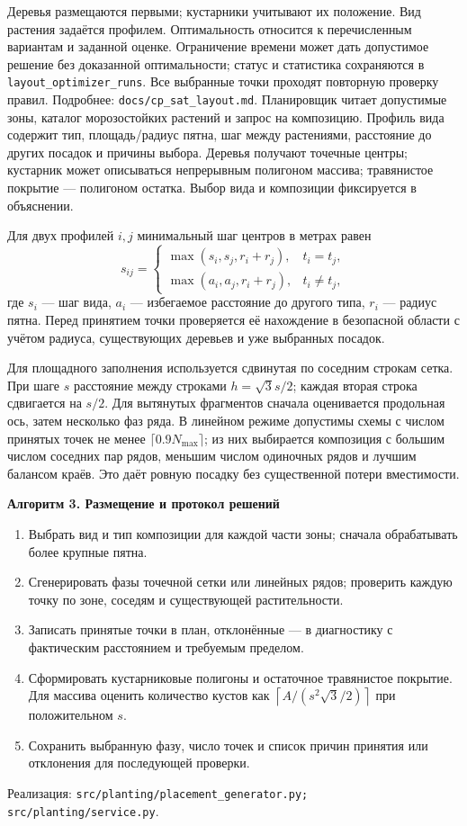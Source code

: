 \documentclass[11pt,a4paper]{article}
\newcommand{\code}[1]{\texttt{#1}}
\newcommand{\src}[1]{\par{\small\color{muted}Реализация: \texttt{#1}.}\par}
\newcommand{\alg}[1]{\medskip\noindent\colorbox{pale}{\parbox{\dimexpr\linewidth-2\fboxsep}{\textbf{#1}}}\smallskip}
\begin{document}
Деревья размещаются первыми; кустарники учитывают их положение. Вид растения задаётся профилем. Оптимальность относится к перечисленным вариантам и заданной оценке. Ограничение времени может дать допустимое решение без доказанной оптимальности; статус и статистика сохраняются в \code{layout\_optimizer\_runs}. Все выбранные точки проходят повторную проверку правил. Подробнее: \code{docs/cp\_sat\_layout.md}.
Планировщик читает допустимые зоны, каталог морозостойких растений и запрос на композицию. Профиль вида содержит тип, площадь/радиус пятна, шаг между растениями, расстояние до других посадок и причины выбора. Деревья получают точечные центры; кустарник может описываться непрерывным полигоном массива; травянистое покрытие --- полигоном остатка. Выбор вида и композиции фиксируется в объяснении.

Для двух профилей $i,j$ минимальный шаг центров в метрах равен
\begin{equation}
s_{ij}=\begin{cases}
\max(s_i,s_j,r_i+r_j),&t_i=t_j,\\
\max(a_i,a_j,r_i+r_j),&t_i\ne t_j,
\end{cases}
\end{equation}
где $s_i$ --- шаг вида, $a_i$ --- избегаемое расстояние до другого типа, $r_i$ --- радиус пятна. Перед принятием точки проверяется её нахождение в безопасной области с учётом радиуса, существующих деревьев и уже выбранных посадок.

Для площадного заполнения используется сдвинутая по соседним строкам сетка. При шаге $s$ расстояние между строками $h=\sqrt{3}s/2$; каждая вторая строка сдвигается на $s/2$. Для вытянутых фрагментов сначала оценивается продольная ось, затем несколько фаз ряда. В линейном режиме допустимы схемы с числом принятых точек не менее $\lceil0.9N_{\max}\rceil$; из них выбирается композиция с большим числом соседних пар рядов, меньшим числом одиночных рядов и лучшим балансом краёв. Это даёт ровную посадку без существенной потери вместимости.

\alg{Алгоритм 3. Размещение и протокол решений}
\begin{enumerate}
\item Выбрать вид и тип композиции для каждой части зоны; сначала обрабатывать более крупные пятна.
\item Сгенерировать фазы точечной сетки или линейных рядов; проверить каждую точку по зоне, соседям и существующей растительности.
\item Записать принятые точки в план, отклонённые --- в диагностику с фактическим расстоянием и требуемым пределом.
\item Сформировать кустарниковые полигоны и остаточное травянистое покрытие. Для массива оценить количество кустов как $\left\lceil A/(s^2\sqrt{3}/2)\right\rceil$ при положительном $s$.
\item Сохранить выбранную фазу, число точек и список причин принятия или отклонения для последующей проверки.
\end{enumerate}
\src{src/planting/placement\_generator.py; src/planting/service.py}
\end{document}

